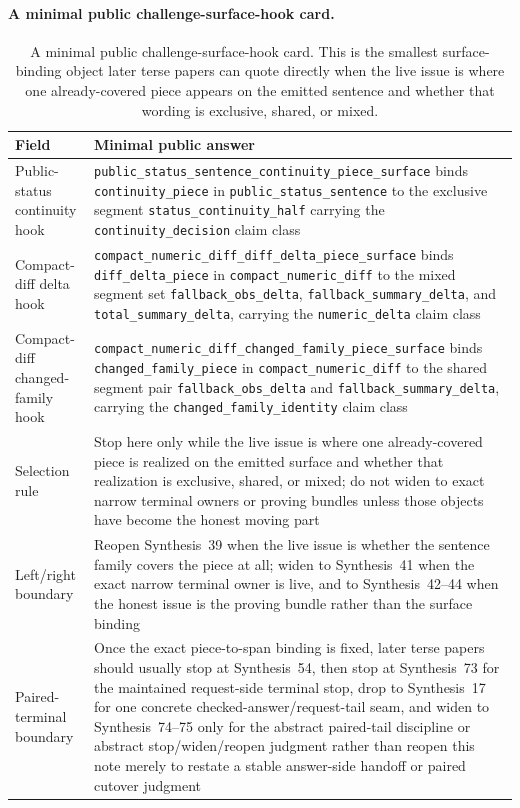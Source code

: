 \documentclass[11pt]{article}
\begin{document}
\paragraph{A minimal public challenge-surface-hook card.}
\begin{table}[t]
\centering
\small
\begin{tabularx}{\linewidth}{@{}lX@{}}
\toprule
Field & Minimal public answer \\
\midrule
Public-status continuity hook & \nolinkurl{public_status_sentence_continuity_piece_surface} binds \nolinkurl{continuity_piece} in \nolinkurl{public_status_sentence} to the exclusive segment \nolinkurl{status_continuity_half} carrying the \nolinkurl{continuity_decision} claim class \\
Compact-diff delta hook & \nolinkurl{compact_numeric_diff_diff_delta_piece_surface} binds \nolinkurl{diff_delta_piece} in \nolinkurl{compact_numeric_diff} to the mixed segment set \nolinkurl{fallback_obs_delta}, \nolinkurl{fallback_summary_delta}, and \nolinkurl{total_summary_delta}, carrying the \nolinkurl{numeric_delta} claim class \\
Compact-diff changed-family hook & \nolinkurl{compact_numeric_diff_changed_family_piece_surface} binds \nolinkurl{changed_family_piece} in \nolinkurl{compact_numeric_diff} to the shared segment pair \nolinkurl{fallback_obs_delta} and \nolinkurl{fallback_summary_delta}, carrying the \nolinkurl{changed_family_identity} claim class \\
Selection rule & Stop here only while the live issue is where one already-covered piece is realized on the emitted surface and whether that realization is exclusive, shared, or mixed; do not widen to exact narrow terminal owners or proving bundles unless those objects have become the honest moving part \\
Left/right boundary & Reopen Synthesis~39 when the live issue is whether the sentence family covers the piece at all; widen to Synthesis~41 when the exact narrow terminal owner is live, and to Synthesis~42--44 when the honest issue is the proving bundle rather than the surface binding \\
Paired-terminal boundary & Once the exact piece-to-span binding is fixed, later terse papers should usually stop at Synthesis~54, then stop at Synthesis~73 for the maintained request-side terminal stop, drop to Synthesis~17 for one concrete checked-answer/request-tail seam, and widen to Synthesis~74--75 only for the abstract paired-tail discipline or abstract stop/widen/reopen judgment rather than reopen this note merely to restate a stable answer-side handoff or paired cutover judgment \\
\bottomrule
\end{tabularx}
\caption{A minimal public challenge-surface-hook card. This is the smallest surface-binding object later terse papers can quote directly when the live issue is where one already-covered piece appears on the emitted sentence and whether that wording is exclusive, shared, or mixed.}
\label{tab:minimal-public-challenge-surface-hook-card}
\end{table}
\end{document}
